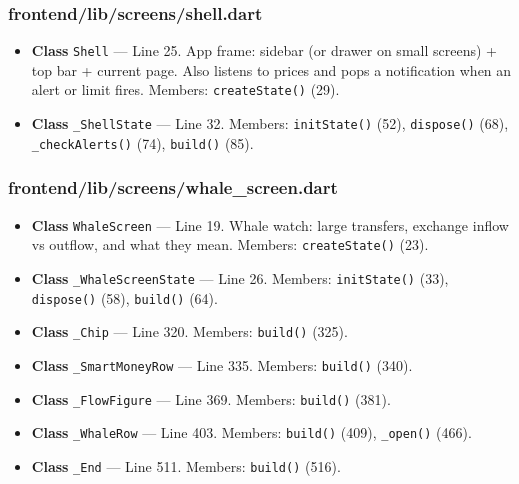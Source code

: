 \subsubsection*{frontend/lib/screens/shell.dart}
\begin{itemize}[nosep,leftmargin=1.5em]
\item \textbf{Class} \texttt{Shell} --- Line 25. App frame: sidebar (or drawer on small screens) + top bar + current page. Also listens to prices and pops a notification when an alert or limit fires. Members: \texttt{createState(\allowbreak{})} (29).
\item \textbf{Class} \texttt{\_\allowbreak{}ShellState} --- Line 32. Members: \texttt{initState(\allowbreak{})} (52), \texttt{dispose(\allowbreak{})} (68), \texttt{\_\allowbreak{}checkAlerts(\allowbreak{})} (74), \texttt{build(\allowbreak{})} (85).
\end{itemize}
\subsubsection*{frontend/lib/screens/whale\_screen.dart}
\begin{itemize}[nosep,leftmargin=1.5em]
\item \textbf{Class} \texttt{WhaleScreen} --- Line 19. Whale watch: large transfers, exchange inflow vs outflow, and what they mean. Members: \texttt{createState(\allowbreak{})} (23).
\item \textbf{Class} \texttt{\_\allowbreak{}WhaleScreenState} --- Line 26. Members: \texttt{initState(\allowbreak{})} (33), \texttt{dispose(\allowbreak{})} (58), \texttt{build(\allowbreak{})} (64).
\item \textbf{Class} \texttt{\_\allowbreak{}Chip} --- Line 320. Members: \texttt{build(\allowbreak{})} (325).
\item \textbf{Class} \texttt{\_\allowbreak{}SmartMoneyRow} --- Line 335. Members: \texttt{build(\allowbreak{})} (340).
\item \textbf{Class} \texttt{\_\allowbreak{}FlowFigure} --- Line 369. Members: \texttt{build(\allowbreak{})} (381).
\item \textbf{Class} \texttt{\_\allowbreak{}WhaleRow} --- Line 403. Members: \texttt{build(\allowbreak{})} (409), \texttt{\_\allowbreak{}open(\allowbreak{})} (466).
\item \textbf{Class} \texttt{\_\allowbreak{}End} --- Line 511. Members: \texttt{build(\allowbreak{})} (516).
\end{itemize}
